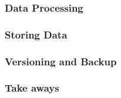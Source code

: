 \documentclass{beamer}
\begin{document}
\begin{frame}
  \frametitle{Data Processing}
\end{frame}

\begin{frame}
  \frametitle{Storing Data}
\end{frame}

\begin{frame}
  \frametitle{Versioning and Backup}
\end{frame}

\begin{frame}
  \frametitle{Take aways}
  
\end{frame}
\end{document}
